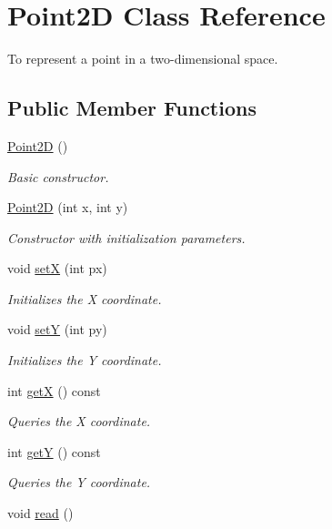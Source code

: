 \hypertarget{classPoint2D}{}\section{Point2D Class Reference}
\label{classPoint2D}


To represent a point in a two-\/dimensional space.  


\subsection*{Public Member Functions}
\begin{DoxyCompactItemize}
\item 
\hyperlink{classPoint2D_a2415006d697f1c222c17254bdd302098}{Point2D} ()\hypertarget{classPoint2D_a2415006d697f1c222c17254bdd302098}{}\label{classPoint2D_a2415006d697f1c222c17254bdd302098}

\begin{DoxyCompactList}\small\item\em Basic constructor. \end{DoxyCompactList}\item 
\hyperlink{classPoint2D_a925d8fbd28c1bec7ff05f24c9ce8d182}{Point2D} (int x, int y)
\begin{DoxyCompactList}\small\item\em Constructor with initialization parameters. \end{DoxyCompactList}\item 
void \hyperlink{classPoint2D_af268842e8f2e6072ffe345dc2f322046}{setX} (int px)
\begin{DoxyCompactList}\small\item\em Initializes the X coordinate. \end{DoxyCompactList}\item 
void \hyperlink{classPoint2D_a0e08240b54e6eaae92c979082da1c91c}{setY} (int py)
\begin{DoxyCompactList}\small\item\em Initializes the Y coordinate. \end{DoxyCompactList}\item 
int \hyperlink{classPoint2D_a6cff00d11a53dc1af436225f02bc324b}{getX} () const 
\begin{DoxyCompactList}\small\item\em Queries the X coordinate. \end{DoxyCompactList}\item 
int \hyperlink{classPoint2D_a1b9e163b3642485c46a1f68c54d735fc}{getY} () const 
\begin{DoxyCompactList}\small\item\em Queries the Y coordinate. \end{DoxyCompactList}\item 
void \hyperlink{classPoint2D_ac13d12003e2da9afee19a6a3f526c660}{read} ()\hypertarget{classPoint2D_ac13d12003e2da9afee19a6a3f526c660}{}\label{classPoint2D_ac13d12003e2da9afee19a6a3f526c660}


\end{DoxyCompactItemize}
